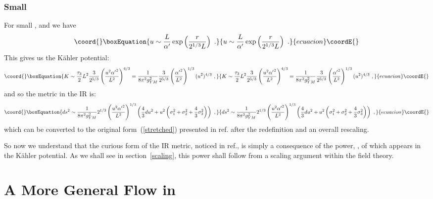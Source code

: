 \documentclass[a4paper,12pt]{article}
\providecommand{\reef}[1]{(\ref{#1})}
\begin{document}
\subsubsection{Small \coordHE{}}
\label{infra}

For small \coordHE{}, \coordHE{} and we have
\begin{equation}\coord{}\boxEquation{
  u \sim \frac{L}{\alpha'} \exp\left( \frac{r}{2^{1/3} L} \right)\ .
}{
  u \sim \frac{L}{\alpha'} \exp\left( \frac{r}{2^{1/3} L} \right)\ .
}{ecuacion}\coordE{}\end{equation}
This gives us the K\"ahler potential:
\begin{equation}\coord{}\boxEquation{
  K \sim \frac{\tau_3}{2} L^2 \frac{3}{2^{5/3}} \left(\frac{u^2 {\alpha'}^2}{L^2}\right)^{4/3} = \frac{1}{8 \pi^2 g_{YM}^2} \frac{3}{2^{5/3}} \left(\frac{{\alpha'}^2}{L^2}\right)^{1/3} (u^2)^{4/3} \ ,
}{
  K \sim \frac{\tau_3}{2} L^2 \frac{3}{2^{5/3}} \left(\frac{u^2 {\alpha'}^2}{L^2}\right)^{4/3} = \frac{1}{8 \pi^2 g_{YM}^2} \frac{3}{2^{5/3}} \left(\frac{{\alpha'}^2}{L^2}\right)^{1/3} (u^2)^{4/3} \ ,
}{ecuacion}\coordE{}\end{equation}
and so the metric in the IR is:
\begin{equation}\coord{}\boxEquation{
  ds^2 \sim \frac{1}{8 \pi^2 g_{YM}^2} 2^{1/3} \left(\frac{u^2 {\alpha'}^2}{L^2}\right)^{1/3} \left(\frac{4}{3} du^2 + u^2 \left(\sigma_1^2 + \sigma_2^2 + \frac{4}{3} \sigma_3^2 \right)\right) \ ,
}{
  ds^2 \sim \frac{1}{8 \pi^2 g_{YM}^2} 2^{1/3} \left(\frac{u^2 {\alpha'}^2}{L^2}\right)^{1/3} \left(\frac{4}{3} du^2 + u^2 \left(\sigma_1^2 + \sigma_2^2 + \frac{4}{3} \sigma_3^2 \right)\right) \ ,
}{ecuacion}\coordE{}\end{equation}
which can be converted to the original form~\reef{stretched} presented
in ref.\cite{jlp} after the redefinition \coordHE{} and an overall
rescaling.

So now we understand that the curious form of the IR metric, noticed
in ref.\cite{jlp}, is simply a consequence of the power, \coordHE{}, of
\coordHE{} which appears in the K\"ahler potential. As we shall see in
section~\ref{scaling}, this power shall follow from a scaling
argument within the field theory. 

\section{A More General \coordHE{} Flow in \coordHE{}}
\end{document}
